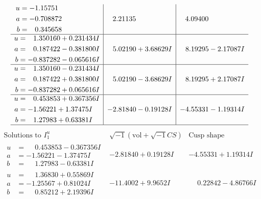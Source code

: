 \documentclass[1p]{elsarticle_modified}
\theoremstyle{definition}
\newcommand{\I}{\sqrt{-1}}
\begin{document}
$$\begin{array}{c|c|c}
\begin{aligned}
u &= -1.15751\phantom{ +0.000000I} \\
a &= -0.708872\phantom{ +0.000000I} \\
b &= \phantom{-}0.345658\phantom{ +0.000000I}\end{aligned}
 & \phantom{-}2.21135\phantom{ +0.000000I} & \phantom{-}4.09400\phantom{ +0.000000I} \\ \hline\begin{aligned}
u &= \phantom{-}1.350160 + 0.231434 I \\
a &= \phantom{-}0.187422 - 0.381800 I \\
b &= -0.837282 - 0.065616 I\end{aligned}
 & \phantom{-}5.02190 + 3.68629 I & \phantom{-}8.19295 - 2.17087 I \\ \hline\begin{aligned}
u &= \phantom{-}1.350160 - 0.231434 I \\
a &= \phantom{-}0.187422 + 0.381800 I \\
b &= -0.837282 + 0.065616 I\end{aligned}
 & \phantom{-}5.02190 - 3.68629 I & \phantom{-}8.19295 + 2.17087 I \\ \hline\begin{aligned}
u &= \phantom{-}0.453853 + 0.367356 I \\
a &= -1.56221 + 1.37475 I \\
b &= \phantom{-}1.27983 + 0.63381 I\end{aligned}
 & -2.81840 - 0.19128 I & -4.55331 - 1.19314 I\\
 \hline 
 \end{array}$$\newpage$$\begin{array}{c|c|c}  
\text{Solutions to }I^u_{1}& \I (\text{vol} + \sqrt{-1}CS) & \text{Cusp shape}\\
 \hline 
\begin{aligned}
u &= \phantom{-}0.453853 - 0.367356 I \\
a &= -1.56221 - 1.37475 I \\
b &= \phantom{-}1.27983 - 0.63381 I\end{aligned}
 & -2.81840 + 0.19128 I & -4.55331 + 1.19314 I \\ \hline\begin{aligned}
u &= \phantom{-}1.36830 + 0.55869 I \\
a &= -1.25567 + 0.81024 I \\
b &= \phantom{-}0.85212 + 2.19396 I\end{aligned}
 & -11.4002 + 9.9652 I & \phantom{-}0.22842 - 4.86766 I \\ \hline\begin{aligned}

\end{aligned}
\end{array}$$
\end{document}
